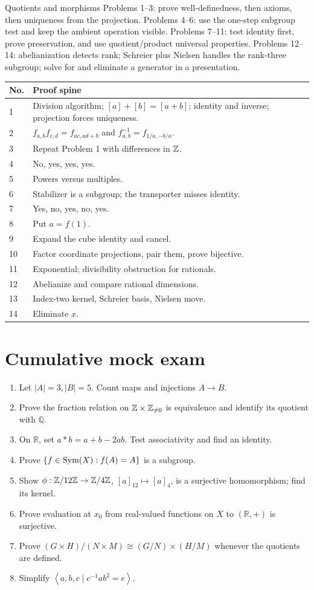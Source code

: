 \documentclass[11pt,openany]{book}
\newcommand{\Q}{\mathbb Q}\newcommand{\R}{\mathbb R}
\newcommand{\angles}[1]{\left\langle#1\right\rangle}
\theoremstyle{definition}
\begin{document}
\begin{checkpoint}{Quotients and morphisms}
Problems 1--3: prove well-definedness, then axioms, then uniqueness from the projection. Problems 4--6: use the one-step subgroup test and keep the ambient operation visible. Problems 7--11: test identity first, prove preservation, and use quotient/product universal properties. Problems 12--14: abelianization detects rank; Schreier plus Nielsen handles the rank-three subgroup; solve for and eliminate a generator in a presentation.
\end{checkpoint}
\begin{longtable}{@{}p{}p{}@{}}\toprule
No.&Proof spine\\\midrule
1&Division algorithm; $[a]+[b]=[a+b]$; identity and inverse; projection forces uniqueness.\\
2&$f_{a,b}f_{c,d}=f_{ac,ad+b}$ and $f_{a,b}^{-1}=f_{1/a,-b/a}$.\\
3&Repeat Problem 1 with differences in $\mathbb Z$.\\4&No, yes, yes, yes.\\5&Powers versus multiples.\\6&Stabilizer is a subgroup; the transporter misses identity.\\
7&Yes, no, yes, no, yes.\\8&Put $a=f(1)$.\\9&Expand the cube identity and cancel.\\10&Factor coordinate projections, pair them, prove bijective.\\
11&Exponential; divisibility obstruction for rationals.\\12&Abelianize and compare rational dimensions.\\13&Index-two kernel, Schreier basis, Nielsen move.\\14&Eliminate $x$.\\\bottomrule\end{longtable}


\section{Cumulative mock exam}
\begin{enumerate}
\item Let $|A|=3,|B|=5$. Count maps and injections $A\to B$.
\item Prove the fraction relation on $\mathbb Z\times\mathbb Z_{\ne0}$ is equivalence and identify its quotient with $\Q$.
\item On $\R$, set $a*b=a+b-2ab$. Test associativity and find an identity.
\item Prove $\{f\in\operatorname{Sym}(X):f(A)=A\}$ is a subgroup.
\item Show $\phi:\mathbb Z/12\mathbb Z\to\mathbb Z/4\mathbb Z$, $[a]_{12}\mapsto[a]_4$, is a surjective homomorphism; find its kernel.
\item Prove evaluation at $x_0$ from real-valued functions on $X$ to $(\R,+)$ is surjective.
\item Prove $(G\times H)/(N\times M)\cong(G/N)\times(H/M)$ whenever the quotients are defined.
\item Simplify $\angles{a,b,c\mid c^{-1}ab^2=e}$.
\end{enumerate}
\end{document}
